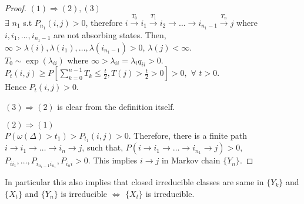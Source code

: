 \documentclass[all-lectures.tex]{subfiles}
\begin{document}
\begin{proof}{$(1)	\Rightarrow (2), (3)$}\\
	
$\exists$ $n_1$ s.t $P_{n_1}(i,j) > 0$,  therefore $i \xrightarrow{T_0} i_1 \xrightarrow{T_1} i_2 \rightarrow \dots \rightarrow i_{n_1-1} \xrightarrow{T_n} j$ where $i, i_1, \dots, i_{n_1-1}$ are not absorbing states. Then,
 $\infty > \lambda(i),\lambda(i_1),\dots,\lambda(i_{n_1-1})>0$, $\lambda(j) < \infty$.\\
$T_0 \sim \exp(\lambda_{ii})$ where $\infty > \lambda_{ii} = \lambda_i q_{ii} > 0$.\\
$P_t(i,j) \ge P[\sum_{k=0}^{n-1} T_k \le \frac{t}{2} , T(j) > \frac{t}{2} > 0] >0,$ \quad $\forall$ $t>0$.\\
Hence $P_t(i,j) >0$.

{$(3)	\Rightarrow (2)$} is clear from the definition itself.

{$(2)	\Rightarrow (1)$}\\
	
$P(\omega(\Delta) > t_1) > P_{t_1}(i,j)  > 0$. Therefore, there is a finite path $i \to i_1 \to \dots \to i_n \to j$,
such that,
$P(i \to i_1 \to \dots \to i_{n_1} \to j) > 0$, $P_{ii_1}, \dots, P_{i_{n_1-1}i_{n_1}} , P_{i_ni} >0$.
This implies $i \to j$ in Markov chain $\{Y_n\}$.
\end{proof}
In particular this also implies that closed irreducible classes are same in $\{Y_k\}$ and $\{X_t\}$ and
$\{Y_n\}$ is irreducible $\Leftrightarrow$ $\{X_t\}$ is irreducible.
\end{document}
